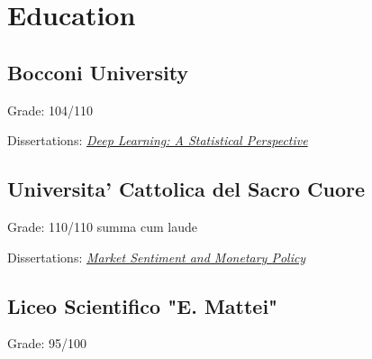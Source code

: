 \documentclass[]{deedy-resume-reversed}
\begin{document}
\begin{minipage}[t]{0.33\textwidth}


\section{Education}

\subsection{Bocconi University}
\vspace{\topsep}
\begin{tightemize}
\item Grade: 104/110
\item Dissertations:  \href{https://drive.google.com/file/d/1ghVGjHLF-3TWeLRvPGTQDK4CHJFv4mxt/view?usp=sharing}{\it Deep Learning: A Statistical Perspective}
\end{tightemize}
\sectionsep

\subsection{Universita' Cattolica del Sacro Cuore}
\begin{tightemize}
\item Grade: 110/110 summa cum laude
\item Dissertations:  \href{https://drive.google.com/file/d/0B3_3DE5m8SV5R3F4LThXS052SDA/view}{\it Market Sentiment and Monetary Policy}
\end{tightemize}
\sectionsep

\subsection{Liceo Scientifico "E. Mattei"}
\begin{tightemize}
\item Grade: 95/100
\end{tightemize}
\sectionsep






\end{minipage}
\end{document}
